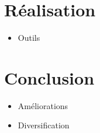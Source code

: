 \documentclass[usepdftitle=false]{beamer}
\begin{document}
	\section{Réalisation}
	\begin{frame}
		\begin{itemize}
			\item Outils
		\end{itemize}
	\end{frame}
	
	\section{Conclusion}
	\begin{frame}
		\begin{itemize}
			\item Améliorations
			\item Diversification
		\end{itemize}
	\end{frame}
\end{document}
